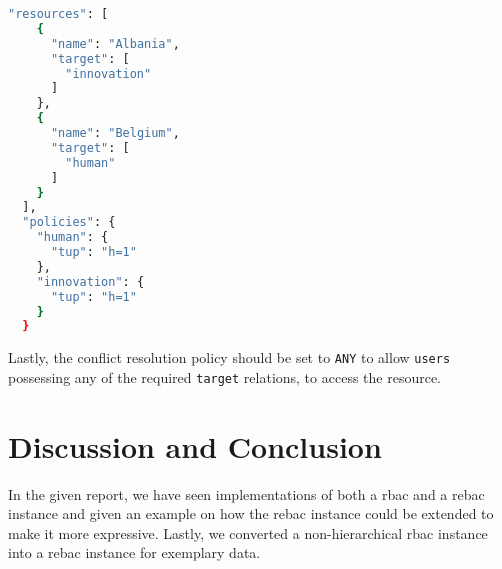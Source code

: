 \documentclass{semdoc}
\begin{document}
\begin{lstlisting}[float, language=bash, label={rebac2}, caption={Transferring access restrictions for resources from RBAC to a ReBAC instance}]
  "resources": [
    {
      "name": "Albania", 
      "target": [ 
        "innovation"
      ]
    }, 
    {
      "name": "Belgium",
      "target": [
        "human"
      ]
    }
  ], 
  "policies": {
    "human": {
      "tup": "h=1"
    },
    "innovation": {
      "tup": "h=1"
    }
  }
\end{lstlisting}


Lastly, the conflict resolution policy should be set to \texttt{ANY} to allow \texttt{users} possessing any of the required \texttt{target} relations, to access the resource.

\section{Discussion and Conclusion}
In the given report, we have seen implementations of both a \gls{rbac} and a \gls{rebac} instance and given an example on how the \gls{rebac} instance could be extended to make it more expressive.
Lastly, we converted a non-hierarchical \gls{rbac} instance into a \gls{rebac} instance for exemplary data. 


\printbibliography
\end{document}
